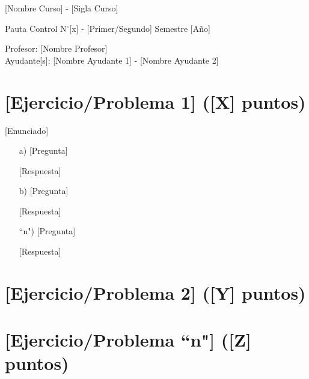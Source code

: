 \documentclass[letterpaper,11pt,oneside]{article}
\newcommand{\grad}{$^{\circ}$}
\begin{document}
	\begin{center}
		{\Large [Nombre Curso] - [Sigla Curso]}
		\par {\large Pauta Control N\grad [x] - [Primer/Segundo] Semestre [Año]}
	\end{center}

	\begin{center}
		Profesor: [Nombre Profesor]\\
		Ayudante[s]: [Nombre Ayudante 1] - [Nombre Ayudante 2]
	\end{center}
	
\section*{[Ejercicio/Problema 1] ([X] puntos)}

[Enunciado]

\begin{itemize}
    \item[a)] [Pregunta]
    
    [Respuesta]
    
    \item[b)] [Pregunta]
    
    [Respuesta]
    
    \item[``n")] [Pregunta]
    
    [Respuesta]
\end{itemize}

\section*{[Ejercicio/Problema 2] ([Y] puntos)}

\section*{[Ejercicio/Problema ``n"] ([Z] puntos)}
\end{document}

